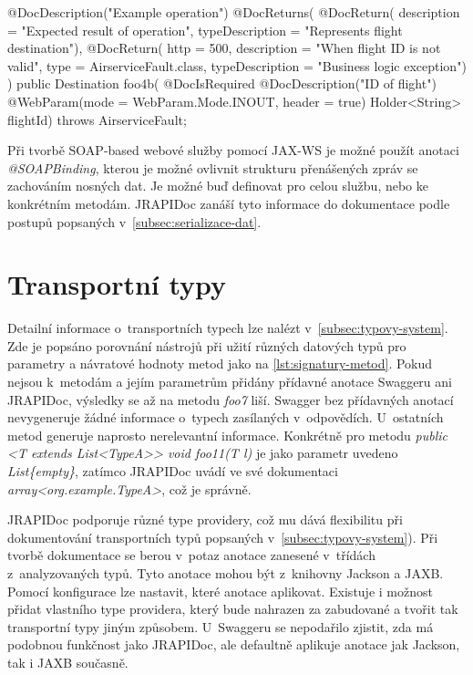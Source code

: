 \documentclass[11pt,twoside,a4paper]{book}
\begin{document}
\begin{code}[frame=single, caption={Metoda SOAP-based webové služby s~užitím
JRAPIDoc anotací}, label={lst:soap-metoda-jrapidoc-ukazka}] 
@DocDescription("Example operation") 
@DocReturns({
  @DocReturn(
    description = "Expected result of operation", 
    typeDescription = "Represents flight destination"), 
  @DocReturn(
    http = 500, 
    description = "When flight ID is not valid", 
    type = AirserviceFault.class, 
    typeDescription = "Business logic exception")
}) 
public Destination foo4b(
  @DocIsRequired 
  @DocDescription("ID of flight")
  @WebParam(mode = WebParam.Mode.INOUT, header = true) 
  Holder<String> flightId) throws AirserviceFault;
\end{code}

Při tvorbě SOAP-based webové služby pomocí JAX-WS je možné použít anotaci {\em
@SOAPBinding}, kterou je možné ovlivnit strukturu přenášených zpráv se
zachováním nosných dat. Je možné buď definovat pro celou službu, nebo ke
konkrétním metodám. JRAPIDoc zanáší tyto informace do dokumentace podle postupů
popsaných v~\ref{subsec:serializace-dat}.

\section{Transportní typy}

Detailní informace o~transportních typech lze nalézt
v~\ref{subsec:typovy-system}.
Zde je popsáno porovnání nástrojů při užití různých datových typů pro parametry
a návratové hodnoty metod jako na \ref{lst:signatury-metod}. Pokud nejsou
k~metodám a jejím parametrům přidány přídavné anotace Swaggeru ani JRAPIDoc,
výsledky se až na metodu {\em foo7} liší. Swagger bez přídavných anotací
nevygeneruje žádné informace o~typech zasílaných v~odpovědích. U~ostatních metod
generuje naprosto nerelevantní informace. Konkrétně pro metodu {\em public <T
extends List<TypeA>> void foo11(T l)} je jako parametr uvedeno {\em
List\{empty\}}, zatímco JRAPIDoc uvádí ve své dokumentaci {\em
array<org.example.TypeA>}, což je správně.

JRAPIDoc podporuje různé type providery, což mu dává flexibilitu při
dokumentování transportních typů popsaných v~\ref{subsec:typovy-system}). Při
tvorbě dokumentace se berou v~potaz anotace zanesené v~třídách z~analyzovaných
typů. Tyto anotace mohou být z~knihovny Jackson a JAXB. Pomocí konfigurace lze
nastavit, které anotace aplikovat. Existuje i možnost přidat vlastního type
providera, který bude nahrazen za zabudované a tvořit tak transportní typy jiným
způsobem.
U~Swaggeru se nepodařilo zjistit, zda má podobnou funkčnost jako JRAPIDoc, ale
defaultně aplikuje anotace jak Jackson, tak i JAXB současně.
\end{document}
